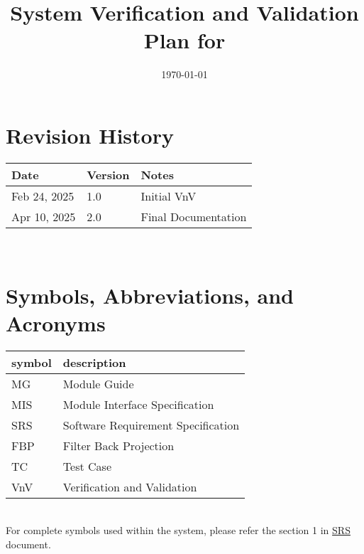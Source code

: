 \documentclass[12pt, titlepage]{article}
\begin{document}


\title{System Verification and Validation Plan for \progname{}}
\author{\authname}
\date{\today}
\maketitle


\section*{Revision History}

\begin{tabularx}{\textwidth}{p{3cm}p{2cm}X}
\toprule {\bf Date} & {\bf Version} & {\bf Notes}\\
\midrule
Feb 24, 2025 & 1.0 & Initial VnV\\
Apr 10, 2025 & 2.0 & Final Documentation\\
\bottomrule
\end{tabularx}

~\\

\newpage

\tableofcontents

\listoftables


\newpage

\section{Symbols, Abbreviations, and Acronyms}

\renewcommand{\arraystretch}{1.2}
\begin{tabular}{l l}
  \toprule
  \textbf{symbol} & \textbf{description}\\
  \midrule
  MG & Module Guide \\
  MIS & Module Interface Specification \\
  SRS & Software Requirement Specification\\
  FBP & Filter Back Projection \\
  TC & Test Case \\
  VnV & Verification and Validation \\
  \bottomrule
\end{tabular}\\

For complete symbols used within the system, please refer the section 1 in
  \href{https://github.com/marischan888/Computed-Tomography-Image-Reconstruction/blob/main/docs/SRS/SRS.pdf}{SRS}
  document.
\end{document}
